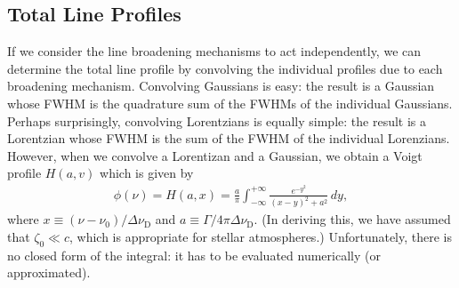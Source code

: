 %
%
%

\newslide

\subsection{Total Line Profiles}

If we consider the line broadening mechanisms to act
independently, we can determine the total line profile by
convolving the individual profiles due to each broadening
mechanism. Convolving Gaussians is easy: the result is a
Gaussian whose FWHM is the quadrature sum of the FWHMs of the individual
Gaussians. Perhaps surprisingly, convolving Lorentzians is
equally simple: the result is a Lorentzian whose FWHM is
the sum of the FWHM of the individual Lorenzians.
However, when we convolve a Lorentizan and a Gaussian, we
obtain a Voigt profile $H(a,v)$ which is given by
\begin{align}
\phi(\nu) = H(a,x) = \frac{a}{\pi} \int_{-\infty}^{+\infty}
\frac{e^{-y^2}}{(x - y)^2 + a^2}\,dy,
\end{align}
where $x \equiv (\nu - \nu_0) / \Delta\nu_\mathrm{D}$ and $a
\equiv \Gamma / 4 \pi \Delta\nu_\mathrm{D}$. (In deriving this,
we have assumed that $\zeta_0 \ll c$, which is appropriate
for stellar atmospheres.) Unfortunately, there is no closed
form of the integral: it has to be evaluated numerically (or approximated).

